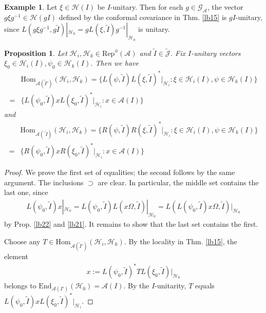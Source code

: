 \documentclass[11pt,b5paper,notitlepage]{article}
\theoremstyle{definition}
\newtheorem{eg}[df]{Example}
\theoremstyle{plain}
\newtheorem{pp}[df]{Proposition}
\newcommand{\wtd}{\widetilde}
\newcommand{\End}{\mathrm{End}} %
\newcommand{\Hom}{\mathrm{Hom}}
\newcommand{\Rep}{\mathrm{Rep}}
\newcommand{\GA}{\mathscr G_{\mathcal A}}
\newcommand{\Jtd}{\widetilde{\mathcal J}}
\newcommand{\bpr}{{}^\backprime}
\newcommand{\MA}{\mathcal A}
\newcommand{\MH}{\mathcal H}
\numberwithin{equation}{section}
\begin{document}
\begin{eg}\label{lb147}
Let $\xi\in\MH(I)$ be $I$-unitary. Then for each $g\in\GA$, the vector $g\xi g^{-1}\in\MH(gI)$ defined by the conformal covariance in Thm. \ref{lb15} is $gI$-unitary, since $L(g\xi g^{-1},g\wtd I)|_{\MH_0}=gL(\xi,\wtd I)g^{-1}|_{\MH_0}$ is unitary.
\end{eg}



\begin{pp}\label{lb34}
Let $\MH_i,\MH_k\in\Rep^\phi(\MA)$ and $\wtd I\in\Jtd$. Fix $I$-unitary vectors $\xi_0\in\MH_i(I),\psi_0\in\MH_k(I)$. Then we have
\begin{align*}
&\Hom_{\MA(\wtd I')}(\MH_i,\MH_k)=\{L(\psi,\wtd I)L(\xi,\wtd I)^*|_{\MH_i}:\xi\in\MH_i(I),\psi\in\MH_k(I)\}\\
=&\{L(\psi_0,\wtd I)xL(\xi_0,\wtd I)^*|_{\MH_i}:x\in\MA(I)\}
\end{align*}
and
\begin{align*}
&\Hom_{\MA(\bpr\wtd I)}(\MH_i,\MH_k)=\{R(\psi,\wtd I)R(\xi,\wtd I)^*|_{\MH_i}:\xi\in\MH_i(I),\psi\in\MH_k(I)\}\\
=&\{R(\psi_0,\wtd I)xR(\xi_0,\wtd I)^*|_{\MH_i}:x\in\MA(I)\}
\end{align*}
\end{pp}

\begin{proof}
We prove the first set of equalities; the second follows by the same argument. The inclusions $\supset$ are clear. In particular, the middle set contains the last one, since
\begin{align*}
L(\psi_0,\wtd I)x|_{\MH_0}=L(\psi_0,\wtd I)L(x\Omega,\wtd I)|_{\MH_0}=L(L(\psi_0,\wtd I)x\Omega,\wtd I)|_{\MH_0}
\end{align*}
by Prop. \ref{lb22} and \ref{lb21}. It remains to show that the last set contains the first.

Choose any $T\in \Hom_{\MA(\wtd I')}(\MH_i,\MH_k)$. By the locality in Thm. \ref{lb15}, the element
\begin{align*}
x:=L(\psi_0,\wtd I)^*TL(\xi_0,\wtd I)|_{\MH_0}
\end{align*}
belongs to $\End_{\MA(I')}(\MH_0)=\MA(I)$. By the $I$-unitarity, $T$ equals $L(\psi_0,\wtd I)xL(\xi_0,\wtd I)^*|_{\MH_i}$.
\end{proof}
\end{document}

